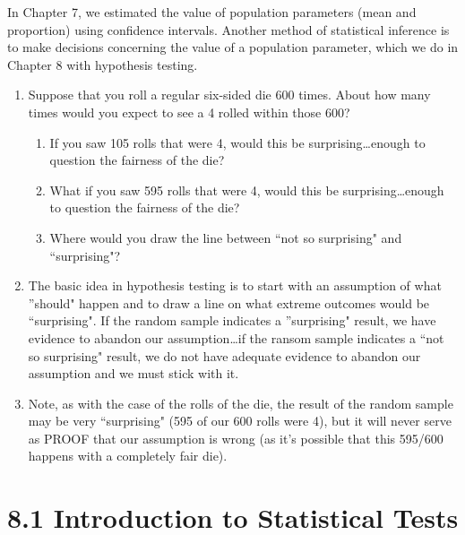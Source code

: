 \documentclass{article}
\begin{document}
In Chapter 7, we estimated the value of population parameters (mean and proportion) using confidence intervals. Another method of statistical inference is to make decisions concerning the value of a population parameter, which we do in Chapter 8 with hypothesis testing.

\begin{enumerate}

  \item Suppose that you roll a regular six-sided die 600 times. About how many times would you expect to see a 4 rolled within those 600?
    
    \begin{enumerate}
    
      \item If you saw 105 rolls that were 4, would this be surprising\ldots enough to question the fairness of the die?

      \item What if you saw 595 rolls that were 4, would this be surprising\ldots enough to question the fairness of the die?

      \item Where would you draw the line between ``not so surprising" and ``surprising"?
      
    \end{enumerate}
    
  \item The basic idea in hypothesis testing is to start with an assumption of what ''should" happen and to draw a line on what extreme outcomes would be ``surprising". If the random sample indicates a ''surprising" result, we have evidence to abandon our assumption\ldots if the ransom sample indicates a ``not so surprising" result, we do not have adequate evidence to abandon our assumption and we must stick with it.
  
  \item Note, as with the case of the rolls of the die, the result of the random sample may be very ``surprising" (595 of our 600 rolls were 4), but it will never serve as PROOF that our assumption is wrong (as it's possible that this 595/600 happens with a completely fair die).
  
\end{enumerate}

\section*{8.1 Introduction to Statistical Tests}
\end{document}
